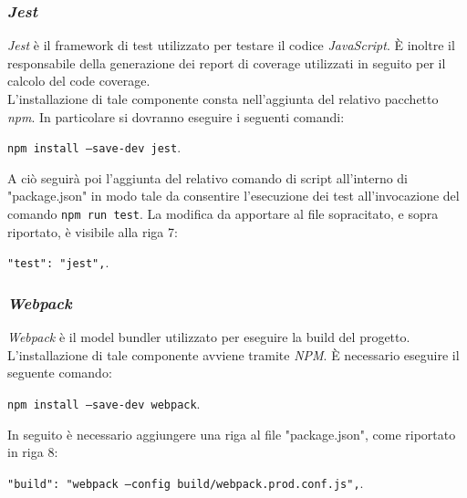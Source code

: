 \subsubsection{\textit{Jest}}\label{jest}
\textit{Jest} è il framework di test utilizzato per testare il codice \textit{JavaScript}. È inoltre il responsabile della generazione dei report di coverage utilizzati in seguito per il calcolo del code coverage.\\
L'installazione di tale componente consta nell'aggiunta del relativo pacchetto \textit{npm}. In particolare si dovranno eseguire i seguenti comandi:
\begin{center}
\texttt{npm install --save-dev jest}.
\end{center}
A ciò seguirà poi l'aggiunta del relativo comando di script all'interno di "package.json" in modo tale da consentire l'esecuzione dei test all'invocazione del comando \texttt{npm run test}. La modifica da apportare al file sopracitato, e sopra riportato, è visibile alla riga 7:
\begin{center}
	\texttt{"test": "jest",}.
\end{center}

\subsubsection{\textit{Webpack}}\label{webpack}
\textit{Webpack} è il model bundler utilizzato per eseguire la build del progetto.\\
L'installazione di tale componente avviene tramite \textit{NPM}. È necessario eseguire il seguente comando:
\begin{center}
	\texttt{npm install --save-dev webpack}.
\end{center}
In seguito è necessario aggiungere una riga al file "package.json", come riportato in riga 8:
\begin{center}
	\texttt{"build": "webpack --config build/webpack.prod.conf.js",}.
\end{center}


